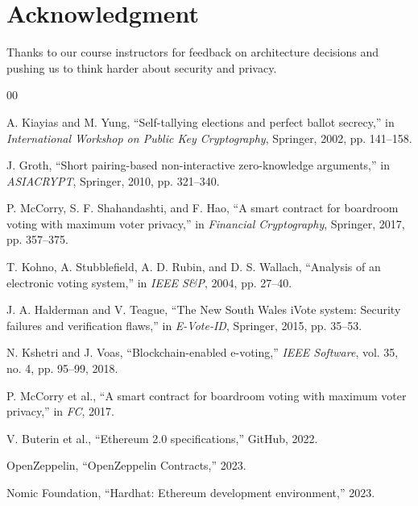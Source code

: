 \documentclass[conference]{IEEEtran}
\begin{document}
\section*{Acknowledgment}
Thanks to our course instructors for feedback on architecture decisions and pushing us to think harder about security and privacy.

\begin{thebibliography}{00}

A. Kiayias and M. Yung, ``Self-tallying elections and perfect ballot secrecy,'' in \textit{International Workshop on Public Key Cryptography}, Springer, 2002, pp. 141--158.

J. Groth, ``Short pairing-based non-interactive zero-knowledge arguments,'' in \textit{ASIACRYPT}, Springer, 2010, pp. 321--340.

P. McCorry, S. F. Shahandashti, and F. Hao, ``A smart contract for boardroom voting with maximum voter privacy,'' in \textit{Financial Cryptography}, Springer, 2017, pp. 357--375.

T. Kohno, A. Stubblefield, A. D. Rubin, and D. S. Wallach, ``Analysis of an electronic voting system,'' in \textit{IEEE S\&P}, 2004, pp. 27--40.

J. A. Halderman and V. Teague, ``The New South Wales iVote system: Security failures and verification flaws,'' in \textit{E-Vote-ID}, Springer, 2015, pp. 35--53.

N. Kshetri and J. Voas, ``Blockchain-enabled e-voting,'' \textit{IEEE Software}, vol. 35, no. 4, pp. 95--99, 2018.

P. McCorry et al., ``A smart contract for boardroom voting with maximum voter privacy,'' in \textit{FC}, 2017.

V. Buterin et al., ``Ethereum 2.0 specifications,'' GitHub, 2022.

OpenZeppelin, ``OpenZeppelin Contracts,'' 2023.

Nomic Foundation, ``Hardhat: Ethereum development environment,'' 2023.

\end{thebibliography}
\end{document}
